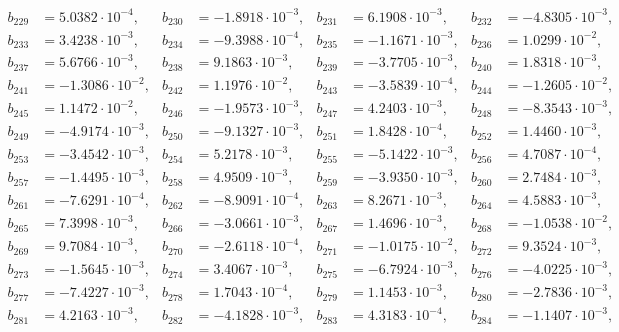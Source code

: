 \begin{align*}
b_{ 229 } &= 5.0382 \cdot 10^{ -4 }, & b_{ 230 } &= -1.8918 \cdot 10^{ -3 }, & b_{ 231 } &= 6.1908 \cdot 10^{ -3 }, & b_{ 232 } &= -4.8305 \cdot 10^{ -3 },\\ 
b_{ 233 } &= 3.4238 \cdot 10^{ -3 }, & b_{ 234 } &= -9.3988 \cdot 10^{ -4 }, & b_{ 235 } &= -1.1671 \cdot 10^{ -3 }, & b_{ 236 } &= 1.0299 \cdot 10^{ -2 },\\ 
b_{ 237 } &= 5.6766 \cdot 10^{ -3 }, & b_{ 238 } &= 9.1863 \cdot 10^{ -3 }, & b_{ 239 } &= -3.7705 \cdot 10^{ -3 }, & b_{ 240 } &= 1.8318 \cdot 10^{ -3 },\\ 
b_{ 241 } &= -1.3086 \cdot 10^{ -2 }, & b_{ 242 } &= 1.1976 \cdot 10^{ -2 }, & b_{ 243 } &= -3.5839 \cdot 10^{ -4 }, & b_{ 244 } &= -1.2605 \cdot 10^{ -2 },\\ 
b_{ 245 } &= 1.1472 \cdot 10^{ -2 }, & b_{ 246 } &= -1.9573 \cdot 10^{ -3 }, & b_{ 247 } &= 4.2403 \cdot 10^{ -3 }, & b_{ 248 } &= -8.3543 \cdot 10^{ -3 },\\ 
b_{ 249 } &= -4.9174 \cdot 10^{ -3 }, & b_{ 250 } &= -9.1327 \cdot 10^{ -3 }, & b_{ 251 } &= 1.8428 \cdot 10^{ -4 }, & b_{ 252 } &= 1.4460 \cdot 10^{ -3 },\\ 
b_{ 253 } &= -3.4542 \cdot 10^{ -3 }, & b_{ 254 } &= 5.2178 \cdot 10^{ -3 }, & b_{ 255 } &= -5.1422 \cdot 10^{ -3 }, & b_{ 256 } &= 4.7087 \cdot 10^{ -4 },\\ 
b_{ 257 } &= -1.4495 \cdot 10^{ -3 }, & b_{ 258 } &= 4.9509 \cdot 10^{ -3 }, & b_{ 259 } &= -3.9350 \cdot 10^{ -3 }, & b_{ 260 } &= 2.7484 \cdot 10^{ -3 },\\ 
b_{ 261 } &= -7.6291 \cdot 10^{ -4 }, & b_{ 262 } &= -8.9091 \cdot 10^{ -4 }, & b_{ 263 } &= 8.2671 \cdot 10^{ -3 }, & b_{ 264 } &= 4.5883 \cdot 10^{ -3 },\\ 
b_{ 265 } &= 7.3998 \cdot 10^{ -3 }, & b_{ 266 } &= -3.0661 \cdot 10^{ -3 }, & b_{ 267 } &= 1.4696 \cdot 10^{ -3 }, & b_{ 268 } &= -1.0538 \cdot 10^{ -2 },\\ 
b_{ 269 } &= 9.7084 \cdot 10^{ -3 }, & b_{ 270 } &= -2.6118 \cdot 10^{ -4 }, & b_{ 271 } &= -1.0175 \cdot 10^{ -2 }, & b_{ 272 } &= 9.3524 \cdot 10^{ -3 },\\ 
b_{ 273 } &= -1.5645 \cdot 10^{ -3 }, & b_{ 274 } &= 3.4067 \cdot 10^{ -3 }, & b_{ 275 } &= -6.7924 \cdot 10^{ -3 }, & b_{ 276 } &= -4.0225 \cdot 10^{ -3 },\\ 
b_{ 277 } &= -7.4227 \cdot 10^{ -3 }, & b_{ 278 } &= 1.7043 \cdot 10^{ -4 }, & b_{ 279 } &= 1.1453 \cdot 10^{ -3 }, & b_{ 280 } &= -2.7836 \cdot 10^{ -3 },\\ 
b_{ 281 } &= 4.2163 \cdot 10^{ -3 }, & b_{ 282 } &= -4.1828 \cdot 10^{ -3 }, & b_{ 283 } &= 4.3183 \cdot 10^{ -4 }, & b_{ 284 } &= -1.1407 \cdot 10^{ -3 },\\ 

\end{align*}
